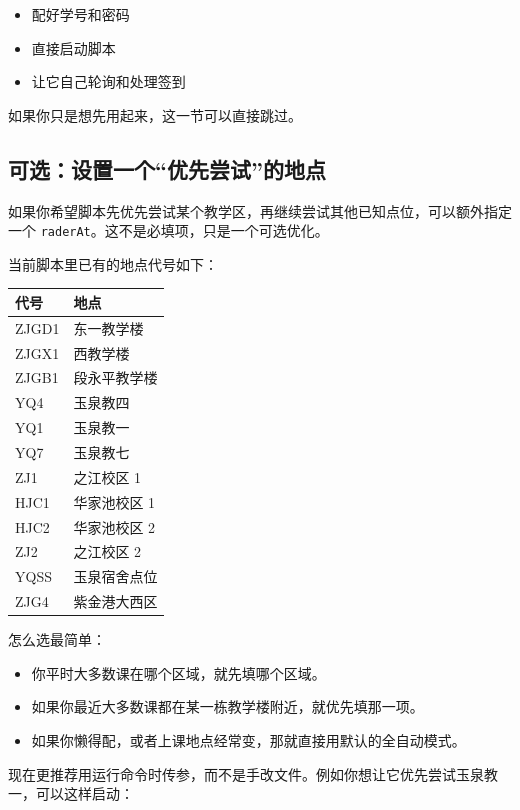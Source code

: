 \documentclass[UTF8,12pt]{ctexart}
\begin{document}
\begin{itemize}
  \item 配好学号和密码
  \item 直接启动脚本
  \item 让它自己轮询和处理签到
\end{itemize}

\noindent 如果你只是想先用起来，这一节可以直接跳过。

\subsection{可选：设置一个“优先尝试”的地点}

\noindent 如果你希望脚本先优先尝试某个教学区，再继续尝试其他已知点位，可以额外指定一个 \texttt{raderAt}。这不是必填项，只是一个可选优化。

\noindent 当前脚本里已有的地点代号如下：

\begin{center}
\begin{tabularx}{0.9\textwidth}{>{\ttfamily}l X}
\hline
代号 & 地点 \\
\hline
ZJGD1 & 东一教学楼 \\
ZJGX1 & 西教学楼 \\
ZJGB1 & 段永平教学楼 \\
YQ4 & 玉泉教四 \\
YQ1 & 玉泉教一 \\
YQ7 & 玉泉教七 \\
ZJ1 & 之江校区 1 \\
HJC1 & 华家池校区 1 \\
HJC2 & 华家池校区 2 \\
ZJ2 & 之江校区 2 \\
YQSS & 玉泉宿舍点位 \\
ZJG4 & 紫金港大西区 \\
\hline
\end{tabularx}
\end{center}

\noindent 怎么选最简单：

\begin{itemize}
  \item 你平时大多数课在哪个区域，就先填哪个区域。
  \item 如果你最近大多数课都在某一栋教学楼附近，就优先填那一项。
  \item 如果你懒得配，或者上课地点经常变，那就直接用默认的全自动模式。
\end{itemize}

\noindent 现在更推荐用运行命令时传参，而不是手改文件。例如你想让它优先尝试玉泉教一，可以这样启动：
\end{document}
